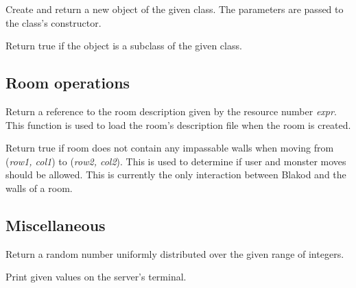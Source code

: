 \documentclass[12pt]{article}
\newenvironment{leftlines}
{\setlength{\oldindent}{\parindent}
 \setlength{\parindent}{0in}\vspace{\baselineskip}}
{\setlength{\parindent}{\oldindent}\vspace{\baselineskip}}
\begin{document}
\begin{leftlines}
\end{leftlines}

Create and return a new object of the given class.  The parameters are
passed to the class's constructor.

\begin{leftlines}
\end{leftlines}

Return true if the object is a subclass of the given class.

\subsection{Room operations}

\begin{leftlines}
\end{leftlines}

Return a reference to the room description given by the resource
number {\em expr}.  This function is used to load the room's
description file when the room is created.

\begin{leftlines}
\end{leftlines}

Return true if room does not contain any impassable walls when moving
from ({\em row1, col1}) to ({\em row2, col2}).  This is used to
determine if user and monster moves should be allowed.  This is
currently the only interaction between Blakod and the walls of a
room.

\subsection{Miscellaneous}

\begin{leftlines}
\end{leftlines}

Return a random number uniformly distributed over the given range of integers.

\begin{leftlines}
\end{leftlines}

Print given values on the server's terminal.
\end{document}
